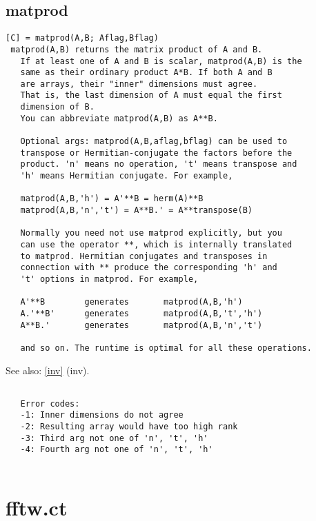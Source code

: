 \documentclass[a4paper]{article}
\begin{document}
\subsection{matprod\label{matprod}}

\begin{tscreen}
\begin{verbatim}
[C] = matprod(A,B; Aflag,Bflag)
 matprod(A,B) returns the matrix product of A and B.
   If at least one of A and B is scalar, matprod(A,B) is the
   same as their ordinary product A*B. If both A and B
   are arrays, their "inner" dimensions must agree.
   That is, the last dimension of A must equal the first
   dimension of B.
   You can abbreviate matprod(A,B) as A**B.

   Optional args: matprod(A,B,aflag,bflag) can be used to
   transpose or Hermitian-conjugate the factors before the
   product. 'n' means no operation, 't' means transpose and
   'h' means Hermitian conjugate. For example,

   matprod(A,B,'h') = A'**B = herm(A)**B
   matprod(A,B,'n','t') = A**B.' = A**transpose(B)

   Normally you need not use matprod explicitly, but you
   can use the operator **, which is internally translated
   to matprod. Hermitian conjugates and transposes in
   connection with ** produce the corresponding 'h' and
   't' options in matprod. For example,

   A'**B        generates       matprod(A,B,'h')
   A.'**B'      generates       matprod(A,B,'t','h')
   A**B.'       generates       matprod(A,B,'n','t')

   and so on. The runtime is optimal for all these operations.
\end{verbatim}

See also: \ref{inv} {(inv)}.
\begin{verbatim}
   
   Error codes:
   -1: Inner dimensions do not agree
   -2: Resulting array would have too high rank
   -3: Third arg not one of 'n', 't', 'h'
   -4: Fourth arg not one of 'n', 't', 'h'
   
\end{verbatim}
\end{tscreen}





\section{fftw.ct}
\end{document}

